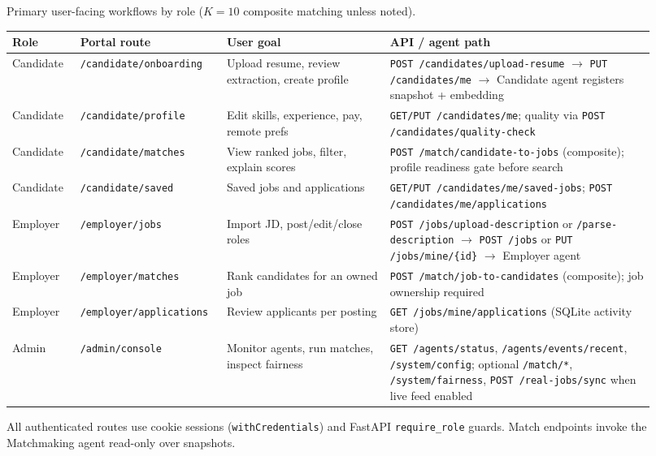 \caption{Primary user-facing workflows by role ($K{=}10$ composite matching unless noted).}
\label{tab:workflows}
\small
\begin{tabular}{@{}>{\raggedright\arraybackslash}p{0.10\linewidth}>{\raggedright\arraybackslash}p{0.19\linewidth}>{\raggedright\arraybackslash}p{0.24\linewidth}>{\raggedright\arraybackslash}p{0.39\linewidth}@{}}
\toprule
Role & Portal route & User goal & API / agent path \\
\midrule
Candidate & \texttt{/candidate/onboarding} & Upload resume, review extraction, create profile & \texttt{POST /candidates/upload-resume} $\rightarrow$ \texttt{PUT /candidates/me} $\rightarrow$ Candidate agent registers snapshot + embedding \\
Candidate & \texttt{/candidate/profile} & Edit skills, experience, pay, remote prefs & \texttt{GET/PUT /candidates/me}; quality via \texttt{POST /candidates/quality-check} \\
Candidate & \texttt{/candidate/matches} & View ranked jobs, filter, explain scores & \texttt{POST /match/candidate-to-jobs} (composite); profile readiness gate before search \\
Candidate & \texttt{/candidate/saved} & Saved jobs and applications & \texttt{GET/PUT /candidates/me/saved-jobs}; \texttt{POST /candidates/me/applications} \\
Employer & \texttt{/employer/jobs} & Import JD, post/edit/close roles & \texttt{POST /jobs/upload-description} or \texttt{/parse-description} $\rightarrow$ \texttt{POST /jobs} or \texttt{PUT /jobs/mine/\{id\}} $\rightarrow$ Employer agent \\
Employer & \texttt{/employer/matches} & Rank candidates for an owned job & \texttt{POST /match/job-to-candidates} (composite); job ownership required \\
Employer & \texttt{/employer/applications} & Review applicants per posting & \texttt{GET /jobs/mine/applications} (SQLite activity store) \\
Admin & \texttt{/admin/console} & Monitor agents, run matches, inspect fairness & \texttt{GET /agents/status}, \texttt{/agents/events/recent}, \texttt{/system/config}; optional \texttt{/match/*}, \texttt{/system/fairness}, \texttt{POST /real-jobs/sync} when live feed enabled \\
\bottomrule
\end{tabular}
\normalsize
\par\vspace{0.4em}
\footnotesize{All authenticated routes use cookie sessions (\texttt{withCredentials}) and FastAPI \texttt{require\_role} guards. Match endpoints invoke the Matchmaking agent read-only over snapshots.}
